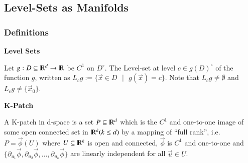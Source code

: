 \documentclass [12 pt, twoside] {book}
\newcommand\+{\text{ }}
\newcommand{\gradient}{\vec{\nabla}}
\newcommand{\exists}{\exists\+}
\begin{document}
\subsection{Level-Sets as Manifolds}
%
%
%
%
%
%

\subsubsection{Definitions}

\textbf{Level Sets}

Let $g: D \subseteq \varmathbb{R}^d \to \varmathbb{R}$ be
$C^1$ on $D^\circ$. The Level-set at level $c \in g(D)^\circ$ of the function $g$, written as
$L_c g := \{\vec{x} \in D \+|\+ g(\vec{x}) = c\}$. Note that $L_c g \neq
\emptyset$ and $L_c g \neq \{\vec{x}_0\}$.

\textbf{K-Patch}

A K-patch in d-space is a set $P \subseteq \varmathbb{R}^d$ which is the $C^1$
and one-to-one image of some open connected set in $\varmathbb{R}^k (k \leq d)$
by a mapping of ``full rank'', i.e. $P = \vec{\phi}(U)$ where $U \subseteq
\varmathbb{R}^k$ is open and connected, $\vec{\phi}$ is $C^1$ and one-to-one and
$\{\partial_{u_1} \vec{\phi}, \partial_{u_2} \vec{\phi}, \dots, \partial_{u_k}
\vec{\phi}\}$ are linearly independent for all $\vec{u} \in U$.
\end{document}
